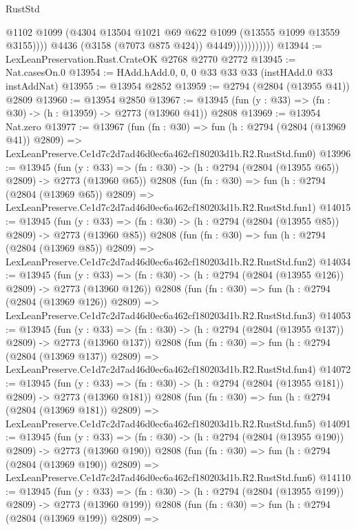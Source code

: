 \begin{lexlean}{RustStd}
\begin{coremodule}
                              @1102
                              @1099
                              (@4304 @13504 @1021 @69 @622 @1099 (@13555 @1099 @13559 @3155))))
                          @4436
                          (@3158 (@7073 @875 @424))
                          @4449)))))))))))
@13944 := LexLeanPreservation.Rust.CrateOK @2768 @2770 @2772
@13945 := Nat.casesOn.{0}
@13954 := HAdd.hAdd.{0, 0, 0} @33 @33 @33 (instHAdd.{0} @33 instAddNat)
@13955 := @13954 @2852
@13959 := @2794 (@2804 (@13955 @41)) @2809
@13960 := @13954 @2850
@13967 := @13945 (fun (y : @33) => (fn : @30) -> (h : @13959) -> @2773 (@13960 @41)) @2808
@13969 := @13954 Nat.zero
@13977 := @13967
    (fun (fn : @30) =>
    fun (h : @2794 (@2804 (@13969 @41)) @2809) =>
    LexLeanPreserve.Ce1d7c2d7ad46d0ec6a462cf180203d1b.R2.RustStd.fun0)
@13996 := @13945
    (fun (y : @33) => (fn : @30) -> (h : @2794 (@2804 (@13955 @65)) @2809) -> @2773 (@13960 @65))
    @2808
    (fun (fn : @30) =>
    fun (h : @2794 (@2804 (@13969 @65)) @2809) =>
    LexLeanPreserve.Ce1d7c2d7ad46d0ec6a462cf180203d1b.R2.RustStd.fun1)
@14015 := @13945
    (fun (y : @33) => (fn : @30) -> (h : @2794 (@2804 (@13955 @85)) @2809) -> @2773 (@13960 @85))
    @2808
    (fun (fn : @30) =>
    fun (h : @2794 (@2804 (@13969 @85)) @2809) =>
    LexLeanPreserve.Ce1d7c2d7ad46d0ec6a462cf180203d1b.R2.RustStd.fun2)
@14034 := @13945
    (fun (y : @33) => (fn : @30) -> (h : @2794 (@2804 (@13955 @126)) @2809) -> @2773 (@13960 @126))
    @2808
    (fun (fn : @30) =>
    fun (h : @2794 (@2804 (@13969 @126)) @2809) =>
    LexLeanPreserve.Ce1d7c2d7ad46d0ec6a462cf180203d1b.R2.RustStd.fun3)
@14053 := @13945
    (fun (y : @33) => (fn : @30) -> (h : @2794 (@2804 (@13955 @137)) @2809) -> @2773 (@13960 @137))
    @2808
    (fun (fn : @30) =>
    fun (h : @2794 (@2804 (@13969 @137)) @2809) =>
    LexLeanPreserve.Ce1d7c2d7ad46d0ec6a462cf180203d1b.R2.RustStd.fun4)
@14072 := @13945
    (fun (y : @33) => (fn : @30) -> (h : @2794 (@2804 (@13955 @181)) @2809) -> @2773 (@13960 @181))
    @2808
    (fun (fn : @30) =>
    fun (h : @2794 (@2804 (@13969 @181)) @2809) =>
    LexLeanPreserve.Ce1d7c2d7ad46d0ec6a462cf180203d1b.R2.RustStd.fun5)
@14091 := @13945
    (fun (y : @33) => (fn : @30) -> (h : @2794 (@2804 (@13955 @190)) @2809) -> @2773 (@13960 @190))
    @2808
    (fun (fn : @30) =>
    fun (h : @2794 (@2804 (@13969 @190)) @2809) =>
    LexLeanPreserve.Ce1d7c2d7ad46d0ec6a462cf180203d1b.R2.RustStd.fun6)
@14110 := @13945
    (fun (y : @33) => (fn : @30) -> (h : @2794 (@2804 (@13955 @199)) @2809) -> @2773 (@13960 @199))
    @2808
    (fun (fn : @30) =>
    fun (h : @2794 (@2804 (@13969 @199)) @2809) =>

\end{coremodule}
\end{lexlean}

